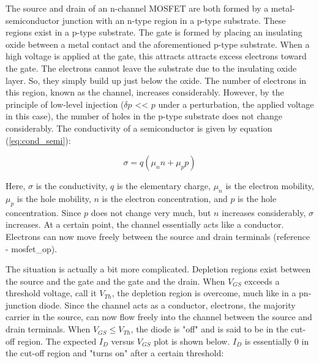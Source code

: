 The source and drain of an n-channel MOSFET are both formed by a metal-semiconductor junction with an n-type region in a p-type substrate. These regions exist in a p-type substrate. The gate is formed by placing an insulating oxide between a metal contact and the aforementioned p-type substrate. When a high voltage is applied at the gate, this attracts attracts excess electrons toward the gate. The electrons cannot leave the substrate due to the insulating oxide layer. So, they simply build up just below the oxide. The number of electrons in this region, known as the channel, increases considerably. However, by the principle of low-level injection ($\delta p$ << $p$ under a perturbation, the applied voltage in this case), the number of holes in the p-type substrate does not change considerably. The conductivity of a semiconductor is given by equation (\ref{eq:cond_semi}):

\begin{equation}
	\label{eq:cond_semi}
	\sigma = q(\mu_n n + \mu_p p)
\end{equation}

Here, $\sigma$ is the conductivity, $q$ is the elementary charge, $\mu_n$ is the electron mobility, $\mu_p$ is the hole mobility, $n$ is the electron concentration, and $p$ is the hole concentration. Since $p$ does not change very much, but $n$ increases considerably, $\sigma$ increases. At a certain point, the channel essentially acts like a conductor. Electrons can now move freely between the source and drain terminals (reference - mosfet\_op).

The situation is actually a bit more complicated. Depletion regions exist between the source and the gate and the gate and the drain. When $V_{GS}$ exceeds a threshold voltage, call it $V_{Th}$, the depletion region is overcome, much like in a pn-junction diode. Since the channel acts as a conductor, electrons, the majority carrier in the source, can now flow freely into the channel between the source and drain terminals. When $V_{GS} \leq V_{Th}$, the diode is "off" and is said to be in the cut-off region. The expected $I_D$ versus $V_{GS}$ plot is shown below. $I_D$ is essentially $0$ in the cut-off region and "turns on" after a certain threshold:

\FloatBarrier

